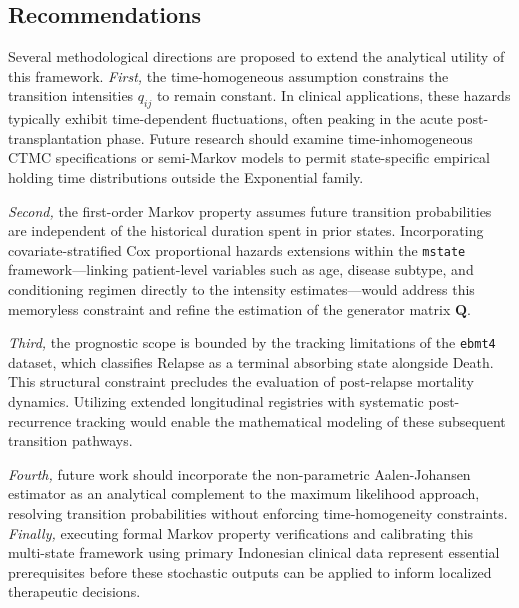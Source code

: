 \documentclass[9pt,a4paper,twocolumn,twoside]{rho-class/rho}
\begin{document}
    \subsection{Recommendations}
      Several methodological directions are proposed to extend the analytical utility of this framework. \textit{First,} the time-homogeneous assumption constrains the transition intensities $q_{ij}$ to remain constant. In clinical applications, these hazards typically exhibit time-dependent fluctuations, often peaking in the acute post-transplantation phase. Future research should examine time-inhomogeneous CTMC specifications or semi-Markov models to permit state-specific empirical holding time distributions outside the Exponential family.

      \textit{Second,} the first-order Markov property assumes future transition probabilities are independent of the historical duration spent in prior states. Incorporating covariate-stratified Cox proportional hazards extensions within the \texttt{mstate} framework—linking patient-level variables such as age, disease subtype, and conditioning regimen directly to the intensity estimates—would address this memoryless constraint and refine the estimation of the generator matrix $\mathbf{Q}$.

      \textit{Third,} the prognostic scope is bounded by the tracking limitations of the \texttt{ebmt4} dataset, which classifies Relapse as a terminal absorbing state alongside Death. This structural constraint precludes the evaluation of post-relapse mortality dynamics. Utilizing extended longitudinal registries with systematic post-recurrence tracking would enable the mathematical modeling of these subsequent transition pathways.

      \textit{Fourth,} future work should incorporate the non-parametric Aalen-Johansen estimator as an analytical complement to the maximum likelihood approach, resolving transition probabilities without enforcing time-homogeneity constraints. \textit{Finally,} executing formal Markov property verifications and calibrating this multi-state framework using primary Indonesian clinical data represent essential prerequisites before these stochastic outputs can be applied to inform localized therapeutic decisions.


\printbibliography
\end{document}
